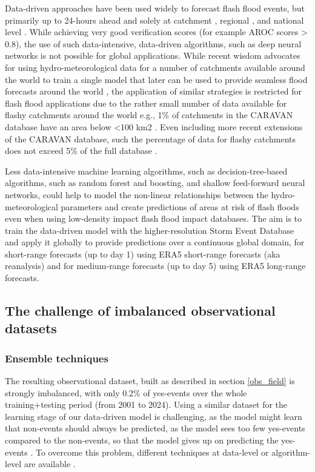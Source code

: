 Data-driven approaches have been used widely to forecast flash flood events, but primarily up to 24-hours ahead and solely at catchment \citep{Zhao_2025, Saleh_2024, Oddo_2024}, regional \citep{Deijns_2024}, and national level \citep{Villacca_2025, Zhao_2022}. While achieving very good verification scores (for example AROC scores > 0.8), the use of such data-intensive, data-driven algorithms, such as deep neural networks is not possible for global applications. While recent wisdom advocates for using hydro-meteorological data for a number of catchments available around the world to train a single model that later can be used to provide seamless flood forecasts around the world \citep{Kratzert_2024}, the application of similar strategies is restricted for flash flood applications due to the rather small number of data available for flashy catchments around the world e.g., 1\% of catchments in the CARAVAN database have an area below <100 km2 \citep{Kratzert_2023}. Even including more recent extensions of the CARAVAN database, such the percentage of data for flashy catchments does not exceed 5\% of the full database \citep{Färber_2024}.

Less data-intensive machine learning algorithms, such as decision-tree-based algorithms, such as random forest and boosting, and shallow feed-forward neural networks, could help to model the non-linear relationships between the hydro-meteorological parameters and create predictions of areas at risk of flash floods even when using low-density impact flash flood impact databases. The aim is to train the data-driven model with the higher-resolution Storm Event Database and apply it globally to provide predictions over a continuous global domain, for short-range forecasts (up to day 1) using ERA5 short-range forecasts (aka reanalysis) and for medium-range forecasts (up to day 5) using ERA5 long-range forecasts.

\subsection{The challenge of imbalanced observational datasets}

\subsubsection{Ensemble techniques}
The resulting observational dataset, built as described in section \ref{obs_field} is strongly imbalanced, with only 0.2\% of yes-events over the whole training+testing period (from 2001 to 2024). Using a similar dataset for the learning stage of our data-driven model is challenging, as the model might learn that non-events should always be predicted, as the model sees too few yes-events compared to the non-events, so that the model gives up on predicting the yes-events \citep{Haixiang_2017}. To overcome this problem, different techniques at data-level or algorithm-level are available \citep{Altalhan_2025}. 

